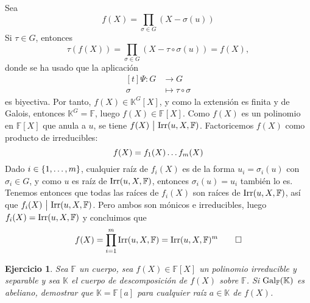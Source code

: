 \documentclass[11pt]{report}
\makeatletter
\renewenvironment{proof}[1][\proofname]{\par
  \pushQED{\qed}%
  \normalfont \topsep\z@skip %
  \trivlist
  \item[\hskip\labelsep
        \itshape
    #1\@addpunct{.}]\ignorespaces
}{%
  \popQED\endtrivlist\@endpefalse
}
\newcommand{\F}{\mathbb F}
\newcommand{\K}{\mathbb K}
\newtheorem{ejercicio}{Ejercicio}
\makeatother
\begin{document}
\begin{proof}
Sea
\[f(X)=\prod_{\sigma \in G}(X-\sigma(u))\]
Si $\tau \in G$, entonces
\[\tau(f(X)) = \prod_{\sigma \in G} (X-\tau \circ \sigma(u)) = f(X),\]
donde se ha usado que la aplicación
\[\begin{aligned}[t]
\Psi \colon G &\to G \\
\sigma &\mapsto \tau \circ \sigma
\end{aligned}
\]
es biyectiva. Por tanto, $f(X) \in \K^G[X]$, y como la extensión es finita y de Galois, entonces $\K^G=\F$, luego $f(X) \in \F[X]$. Como $f(X)$ es un polinomio en $\F[X]$ que anula a $u$, se tiene $f(X) \ \big| \ \textup{Irr}(u,X,\F)$. Factoricemos $f(X)$ como producto de irreducibles:
\[f(X)=f_1(X)\mathellipsis f_m(X)\]
Dado $i \in \{1,\mathellipsis,m\}$, cualquier raíz de $f_i(X)$ es de la forma $u_i=\sigma_i(u)$ con $\sigma_i \in G$, y como $u$ es raíz de $\textup{Irr}(u,X,\F)$, entonces $\sigma_i(u)=u_i$ también lo es. Tenemos entonces que todas las raíces de $f_i(X)$ son raíces de $\textup{Irr}(u,X,\F)$, así que $f_i(X)  \ \big| \ \textup{Irr}(u,X,\F)$. Pero ambos son mónicos e irreducibles, luego $f_i(X) = \textup{Irr}(u,X,\F)$ y concluimos que
\[f(X)=\prod_{i=1}^m \textup{Irr}(u,X,\F) = \textup{Irr}(u,X,\F)^m \qedhere\]
\end{proof}

\begin{ejercicio}
Sea $\F$ un cuerpo, sea $f(X) \in \F[X]$ un polinomio irreducible y separable y sea $\K$ el cuerpo de descomposición de $f(X)$ sobre $\F$. Si $\textup{Gal}_\F(\K)$ es abeliano, demostrar que $\K = \F[a]$ para cualquier raíz $a \in \K$ de $f(X)$.
\end{ejercicio}
\end{document}

